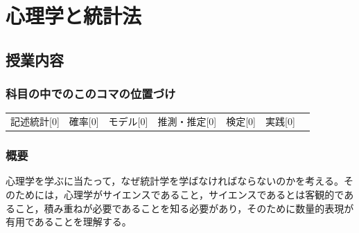 \section{心理学と統計法}
\label{s01_Introduction}
\subsection{授業内容}
\subsubsection{科目の中でのこのコマの位置づけ}
\begin{tabular}[t]{ccccccc}
	記述統計[0] & 確率[0] & モデル[0] & 推測・推定[0] & 検定[0] & 実践[0]
\end{tabular}
\subsubsection{概要}
心理学を学ぶに当たって，なぜ統計学を学ばなければならないのかを考える。そのためには，心理学がサイエンスであること，サイエンスであるとは客観的であること，積み重ねが必要であることを知る必要があり，そのために数量的表現が有用であることを理解する。
